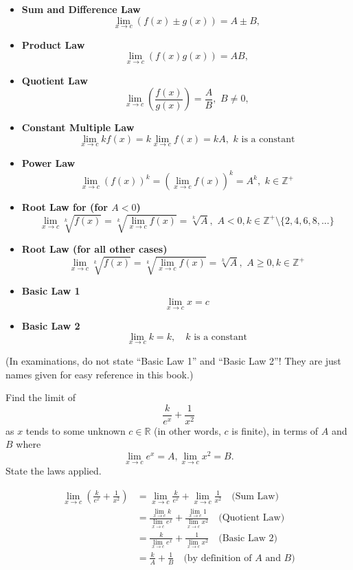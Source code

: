 \begin{itemize}
    \item \textbf{Sum and Difference Law}
    \[
    \lim_{x \to c} (f(x) \pm g(x)) = A \pm B,
    \]
    \item \textbf{Product Law}
    \[
    \lim_{x \to c} (f(x) g(x)) = A B,
    \]
    \item \textbf{Quotient Law}
    \[
    \lim_{x \to c} \left(\frac{f(x)}{g(x)}\right)  = \frac{A}{B},\,\,B\ne 0,
    \]
    \item \textbf{Constant Multiple Law}
    \[
    \lim_{x \to c} kf(x) = k\lim_{x \to c} f(x) = kA,\,\,k\,\,\text{is a constant}
    \]
    \item \textbf{Power Law}
    \[
    \lim_{x \to c} (f(x))^k = (\lim_{x \to c} f(x))^k = A^k,\,\,k \in \mathbb{Z^+}
    \]
    \item \textbf{Root Law for (for $A < 0$)}
    \[
    \lim_{x \to c} \sqrt[k]{f(x)} = \sqrt[k]{\lim_{x \to c} f(x)} = \sqrt[k]{A},\,\,A < 0, k \in \mathbb{Z^+}
    \setminus \{2, 4, 6, 8, ...\}
    \]
    \item \textbf{Root Law (for all other cases)}
    \[
    \lim_{x \to c} \sqrt[k]{f(x)} = \sqrt[k]{\lim_{x \to c} f(x)} = \sqrt[k]{A},\,\,A \ge 0, k \in \mathbb{Z^+}
    \]
    \item \textbf{Basic Law 1}
    \[
    \lim_{x \to c} x = c
    \]
    \item \textbf{Basic Law 2}
    \[
    \lim_{x \to c} k = k, \quad \text{$k$ is a constant}
    \]
\end{itemize}

(In examinations, do not state ``Basic Law 1'' and ``Basic Law 2''! They are just names given for
easy reference in this book.)

\begin{example}
    Find the limit of \[\frac{k}{e^x} + \frac{1}{x^2}\] as $x$ tends to some unknown $c \in \mathbb{R}$
    (in other words, $c$ is finite),
    in terms of $A$ and $B$ where \[\lim_{x \to c} e^x = A, \lim_{x \to c} x^2 = B.\]
    State the laws applied.
\end{example}
\begin{solution}
    \begin{equation*}
        \begin{split}
            \lim_{x \to c} \left(\frac{k}{e^x} + \frac{1}{x^2}\right)
            &= \lim_{x \to c} \frac{k}{e^x} + \lim_{x \to c} \frac{1}{x^2} \quad \text{(Sum Law)} \\
            &= \frac{\lim_{x \to c} k}{\lim_{x \to c} e^x} + \frac{\lim_{x \to c} 1}{\lim_{x \to c} x^2} \quad
            \text{(Quotient Law)} \\
            &= \frac{k}{\lim_{x \to c} e^x} + \frac{1}{\lim_{x \to c} x^2} \quad
            \text{(Basic Law 2)} \\
            &= \frac{k}{A} + \frac{1}{B} \quad
            \text{(by definition of $A$ and $B$)} \\
        \end{split}
    \end{equation*}
\end{solution}

